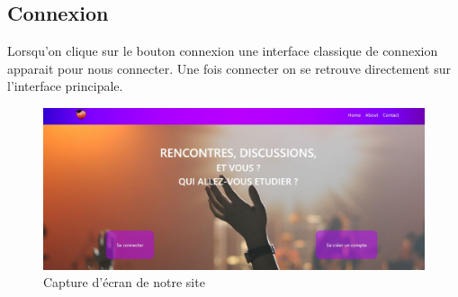 \documentclass[12pt]{report}
\begin{document}
\subsection{Connexion}
	Lorsqu'on clique sur le bouton connexion une interface classique de connexion apparait pour nous connecter. Une fois connecter on se retrouve directement sur l'interface principale.
\begin{figure}[h!]
	\begin{center}
		\includegraphics[scale=0.5]{acceuil.jpg}
	\end{center}
		\caption{Capture d'écran de notre site}
\end{figure}
\clearpage
\end{document}
